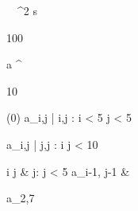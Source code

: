 \begin{eqcode}{\mu}{\ }{\ }{^2}
  s \gets \begin {tmatrix}
  100  \lend
  \end{tmatrix} \lend
  a \gets \genar \limits ^{\begin{tmatrix} 10  \lend \end{tmatrix}} (0) \lend
  a_{i,j} | i,j : i < 5 \cap j < 5  \lend

  a_{i,j} | j,j : i  \cap j < 10 \gets %
  \begin{cases}
    i \cdot j & j: j < 5 \lend
    a_{i-1, j-1} & \otherwise \lend
  \end{cases} \lend

  a_{2,7}  \lend
   \lend
\end{eqcode}
